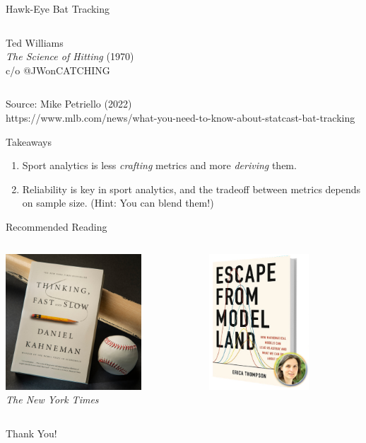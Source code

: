 \documentclass[handout]{beamer}
\begin{document}
\begin{frame}{Hawk-Eye Bat Tracking}
\begin{columns}
\begin{column}{0.4\textwidth}
      Ted Williams\\
      {\it The Science of Hitting} (1970)\\
      c/o @JWonCATCHING
    \end{column}
  \end{columns}
  \vfill
  \hfill\color{ricegray}\tiny Source: Mike Petriello (2022)\\
  \hfill https://www.mlb.com/news/what-you-need-to-know-about-statcast-bat-tracking
\end{frame}

\begin{frame}{Takeaways}
  \begin{enumerate}
    \item Sport analytics is less {\it crafting} metrics and more {\it deriving} them.
    \item Reliability is key in sport analytics, and the tradeoff between metrics depends on sample size. (Hint: You can blend them!)
  \end{enumerate}
\end{frame}

\begin{frame}{Recommended Reading}
  \begin{columns}
    \begin{column}{0.5\textwidth}
      \centering
      \includegraphics[height = 2in]{images/thinking_fast_and_slow.jpg}\\
      \color{ricegray} \tiny \it The New York Times
    \end{column}
    \begin{column}{0.5\textwidth}
      \centering
      \includegraphics[height = 2in]{images/escape_from_model_land.jpg}
    \end{column}
  \end{columns}
\end{frame}

\begin{frame}
  \centering
  \LARGE
  Thank You!
\end{frame}
\end{document}
